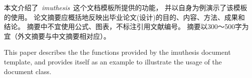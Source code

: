 \begin{cabstract}   %
        本文介绍了~\emph{imuthesis}~这个文档模板所提供的功能，
        并以自身为例演示了该模板的使用。
        论文摘要应概括地反映出毕业论文(设计)的目的、内容、方法、成果和结论。
        摘要中不宜使用公式、图表，不标注引用文献编号。
        摘要以300～500字为宜（外文摘要与中文摘要相对应）。

    \end{cabstract}
    
    \begin{eabstract}
        This paper describes the the functions provided by the imuthesis document template, 
        and provides itself as an example to illustrate the usage of the document class.

    \end{eabstract}